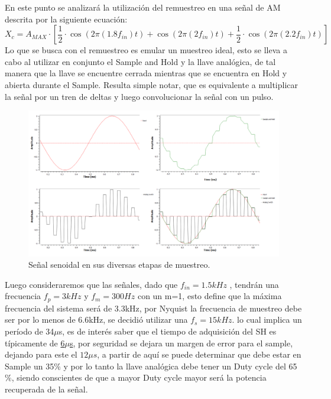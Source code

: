 En este punto se analizará la utilización del remuestreo en una señal de AM descrita por la siguiente ecuación:
\begin{equation}
X_c = A_{MAX} \cdot \left[ \frac{1}{2} \cdot \cos (2 \pi (1.8 f_{in}) t) +\cos (2 \pi (2 f_{in}) t)  + \frac{1}{2} \cdot \cos (2 \pi (2.2 f_{in}) t) \right]
\end{equation}
Lo que se busca con el remuestreo es emular un muestreo ideal, esto se lleva a cabo al utilizar en conjunto el Sample and Hold y la llave analógica, de tal manera que la llave se encuentre cerrada mientras que  se encuentra en Hold y abierta durante el Sample. Resulta simple notar, que es equivalente a multiplicar la señal por un tren de deltas y luego convolucionar la señal con un pulso.
	
\begin{figure}[H]
	\centering
	\includegraphics[width=1\textwidth]{ImagenesEjercicio7/t1.PNG}
\caption{Señal senoidal en sus diversas etapas de muestreo.}
	\label{fig:muestreo}
\end{figure}
Luego consideraremos que las señales, dado que $f_{in} = 1.5kHz$ , tendrán una frecuencia $f_p=3kHz$ y $f_m=300Hz$ con un m=1, esto define que la máxima frecuencia del sistema será de 3.3kHz, por Nyquist la frecuencia de muestreo debe ser por lo menos de 6.6kHz, se decidió utilizar una $f_s = 15kHz$. lo cual implica un período de 34$\mu$s, es de interés saber que el tiempo de adquisición  del SH es típicamente de \href{http://www.ti.com/lit/ds/symlink/lf398-n-mil.pdf}{6$\mu$s}, por seguridad se dejara un margen de error para el sample, dejando para este el $12\mu s$, a partir de aquí se puede determinar que debe estar en Sample un 35$\%$ y por lo tanto la llave analógica debe tener un Duty cycle del 65$\%$, siendo conscientes de que a mayor Duty cycle mayor será la potencia recuperada de la señal.
